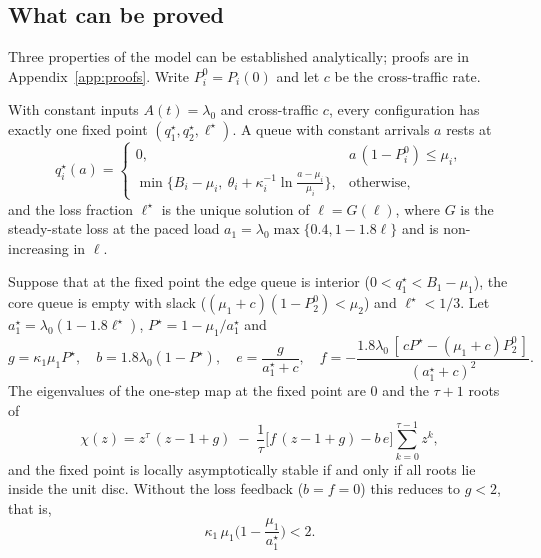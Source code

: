 \subsection{What can be proved}
Three properties of the model can be established analytically; proofs are in Appendix~\ref{app:proofs}. Write $P_i^0=P_i(0)$ and let $c$ be the cross-traffic rate.

\begin{proposition}\label{prop:fp}
With constant inputs $A(t)=\lambda_0$ and cross-traffic $c$, every configuration has exactly one fixed point $(q_1^\star,q_2^\star,\ell^\star)$. A queue with constant arrivals $a$ rests at
\begin{equation}
q_i^\star(a)=\begin{cases}
0, & a\,(1-P_i^0)\le\mu_i,\\[2pt]
\min\!\big\{B_i-\mu_i,\ \theta_i+\kappa_i^{-1}\ln\frac{a-\mu_i}{\mu_i}\big\}, & \text{otherwise},
\end{cases}
\label{eq:qstar}
\end{equation}
and the loss fraction $\ell^\star$ is the unique solution of $\ell=G(\ell)$, where $G$ is the steady-state loss at the paced load $a_1=\lambda_0\max\{0.4,1-1.8\ell\}$ and is non-increasing in $\ell$.
\end{proposition}

\begin{proposition}\label{prop:lin}
Suppose that at the fixed point the edge queue is interior ($0<q_1^\star<B_1-\mu_1$), the core queue is empty with slack ($(\mu_1+c)(1-P_2^0)<\mu_2$) and $\ell^\star<1/3$. Let $a_1^\star=\lambda_0(1-1.8\ell^\star)$, $P^\star=1-\mu_1/a_1^\star$ and
\[
g=\kappa_1\mu_1P^\star,\quad
b=1.8\lambda_0(1-P^\star),\quad
e=\frac{g}{a_1^\star+c},\quad
f=-\frac{1.8\lambda_0\,[\,cP^\star-(\mu_1+c)P_2^0\,]}{(a_1^\star+c)^2}.
\]
The eigenvalues of the one-step map at the fixed point are $0$ and the $\tau+1$ roots of
\begin{equation}
\chi(z)=z^{\tau}\,(z-1+g)\;-\;\frac1\tau\big[f\,(z-1+g)-b\,e\big]\sum_{k=0}^{\tau-1}z^{k},
\label{eq:char}
\end{equation}
and the fixed point is locally asymptotically stable if and only if all roots lie inside the unit disc. Without the loss feedback ($b=f=0$) this reduces to $g<2$, that is,
\begin{equation}
\kappa_1\,\mu_1\Big(1-\frac{\mu_1}{a_1^\star}\Big)<2 .
\label{eq:gain}
\end{equation}
\end{proposition}

